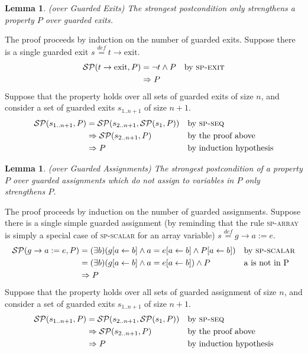 \documentclass[a4paper,10pt]{article}
\newcommand{\KWexit}{\ensuremath{\mathrm{exit}}}
\newcommand{\symdef}{\ensuremath{\overset{\mathit{def}}{=}}}
\newcommand{\spexit}{\textsc{sp-exit}\xspace}
\newcommand{\spscalar}{\textsc{sp-scalar}\xspace}
\newcommand{\sparray}{\textsc{sp-array}\xspace}
\newcommand{\spseq}{\textsc{sp-seq}\xspace}
\newtheorem{lemma}[theorem]{Lemma}
\newenvironment{proof}[1][Proof.]{\begin{trivlist}
\item[\hskip \labelsep {\bfseries #1}]}{\end{trivlist}}
\begin{document}
\begin{lemma}
  \emph{(\spostsym over Guarded Exits)} The strongest postcondition only
  strengthens a property $P$ over guarded exits.
\label{lemma:sp-g-exits}
\end{lemma}

\begin{proof}
  The proof proceeds by induction on the number of guarded exits. Suppose there
  is a single guarded exit $s \symdef t \rightarrow \KWexit$.
  \begin{align*}
    \spost{t \rightarrow \KWexit}{P} 
    &= \neg t \land P && \text{by \spexit}\\
    &\Rightarrow P
  \end{align*}
  Suppose that the property holds over all sets of guarded exits of size $n$,
  and consider a set of guarded exits $s_{1..n+1}$ of size $n+1$.
  \begin{align*}
    \spost{s_{1..n+1}}{P} 
    &= \spost{s_{2..n+1}}{\spost{s_1}{P}}  && \text{by \spseq}\\
    &\Rightarrow \spost{s_{2..n+1}}{P}     && \text{by the proof above}\\
    &\Rightarrow P                         && \text{by induction hypothesis}\\
  \end{align*}
\end{proof}

\begin{lemma}
  \emph{(\spostsym over Guarded Assignments)} The strongest postcondition of a
  property $P$ over guarded assignments which do not assign to variables in $P$
  only strengthens $P$.
\label{lemma:sp-g-assignments}
\end{lemma}

\begin{proof}
  The proof proceeds by induction on the number of guarded assignments. Suppose there
  is a single simple guarded assignment (by reminding that the rule \sparray is simply 
  a special case of \spscalar for an array variable) $s \symdef g \rightarrow a := e$.
  \begin{align*}
    \spost{g \rightarrow a:=e}{P} 
    &= (\exists b) (\subst{g}{a}{b} 
    \land a = \subst{e}{a}{b} \land \subst{P}{a}{b}) && \text{by \spscalar}\\
    &= (\exists b) (\subst{g}{a}{b} 
    \land a = \subst{e}{a}{b}) \land P && \text{a is not in P}\\
    &\Rightarrow P
  \end{align*}
  Suppose that the property holds over all sets of guarded assignment of size $n$,
  and consider a set of guarded exits $s_{1..n+1}$ of size $n+1$.
  \begin{align*}
    \spost{s_{1..n+1}}{P} 
    &= \spost{s_{2..n+1}}{\spost{s_1}{P}}  && \text{by \spseq}\\
    &\Rightarrow \spost{s_{2..n+1}}{P}     && \text{by the proof above}\\
    &\Rightarrow P                         && \text{by induction hypothesis}\\
  \end{align*}
\end{proof}
\end{document}
